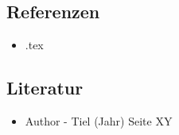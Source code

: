 \documentclass{sajzk}
\begin{document}
\section{}
\label{}
\lhead{}

\subsection{Referenzen}
\begin{itemize}
    \item \nameref{} .tex
\end{itemize}

\subsection{Literatur}
\begin{itemize}
    \item Author - Tiel (Jahr) Seite XY
\end{itemize}
\end{document}
